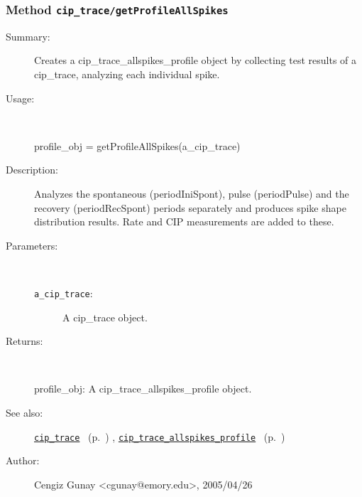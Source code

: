 \subsubsection[Method \texttt{getProfileAllSpikes}]{Method \texttt{cip\_trace/getProfileAllSpikes}}%
%
\label{ref_cip_trace__getProfileAllSpikes}%
\hypertarget{ref_cip_trace__getProfileAllSpikes}{}%
\begin{description}
\item[Summary:]Creates a cip\_trace\_allspikes\_profile object by collecting test results of a cip\_trace, analyzing each individual spike.
%
\item[Usage:]~%
\begin{lyxcode}%
profile\_obj = getProfileAllSpikes(a\_cip\_trace)
%
\end{lyxcode}%
%
\item[Description:]%
Analyzes the spontaneous (periodIniSpont), pulse (periodPulse) and the
 recovery (periodRecSpont) periods separately and produces spike shape
 distribution results. Rate and CIP measurements are added to these.
\item[Parameters:]~
\begin{description}%
\item[\texttt{a\_cip\_trace}:]
 A cip\_trace object.
\end{description}%
%
\item[Returns:]~

	profile\_obj: A cip\_trace\_allspikes\_profile object.
%
%
\item[See also:]%
\hyperlink{ref_cip_trace}{\texttt{cip\_trace}}%
\ (p.~\pageref{ref_cip_trace})%
%
, \hyperlink{ref_cip_trace_allspikes_profile}{\texttt{cip\_trace\_allspikes\_profile}}%
\ (p.~\pageref{ref_cip_trace_allspikes_profile})%
%
%
\item[Author:]%
Cengiz Gunay <cgunay@emory.edu>, 2005/04/26%
\end{description}
\methodline%
